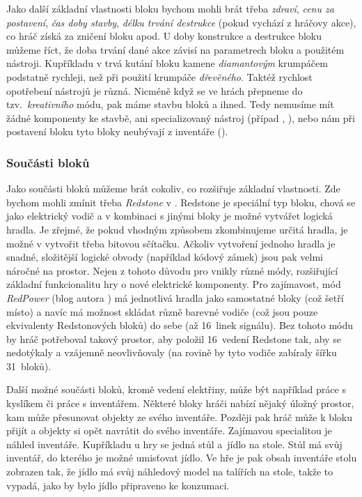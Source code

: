 Jako další základní vlastnosti bloku bychom mohli brát třeba \textit{zdraví}, \textit{cenu za postavení}, \textit{čas doby stavby}, \textit{délku trvání destrukce} (pokud vychází z hráčovy akce), co hráč získá za zničení bloku apod. U doby konstrukce a destrukce bloku můžeme říct, že doba trvání dané akce závisí na parametrech bloku a použitém nástroji. Kupříkladu v  trvá kutání bloku kamene \textit{diamantovým} krumpáčem podstatně rychleji, než při použití krumpáče \textit{dřevěného}. Taktéž rychlost opotřebení nástrojů je různá. Nicméně když se ve hrách přepneme do tzv.~\textit{kreativního} módu, pak máme stavbu bloků  a ihned. Tedy nemusíme mít žádné komponenty ke stavbě, ani specializovaný nástroj (případ \SE{}, \ME{}), nebo nám při postavení bloku tyto bloky neubývají z inventáře (\MC{}). 

\subsubsection{Součásti bloků}
Jako součásti bloků můžeme brát cokoliv, co rozšiřuje základní vlastnosti. Zde bychom mohli zmínit třeba \textit{Redstone} v . Redstone je speciální typ bloku, chová se jako elektrický vodič a v kombinaci s jinými bloky je možné vytvářet logická hradla. Je zřejmé, že pokud vhodným způsobem zkombinujeme určitá hradla, je možné v  vytvořit třeba bitovou sčítačku. Ačkoliv vytvoření jednoho hradla je snadné, složitější logické obvody (například kódový zámek) jsou pak velmi náročné na prostor. Nejen z tohoto důvodu pro \MC{} vnikly různé módy, rozšiřující základní funkcionalitu hry o nové elektrické komponenty. Pro zajímavost, mód \textit{RedPower} (blog autora \citep{eloraam}) má jednotlivá hradla jako samostatné bloky (což šetří místo) a navíc má možnost skládat různě barevné vodiče (což jsou pouze ekvivalenty Redstonových bloků) do sebe (až 16~linek signálu). Bez tohoto módu by hráč potřeboval takový prostor, aby položil 16~vedení Redstone tak, aby se nedotýkaly a vzájemně neovlivňovaly (na rovině by tyto vodiče zabíraly šířku 31~bloků). 

Další možné součásti bloků, kromě vedení elektřiny, může být například práce s kyslíkem či práce s inventářem. Některé bloky hráči nabízí nějaký úložný prostor, kam může přesunovat objekty ze svého inventáře. Později pak hráč může k bloku přijít a objekty si opět navrátit do svého inventáře. Zajímavou specialitou je náhled inventáře. Kupříkladu u hry \ME{} se jedná stůl a~jídlo na stole. Stůl má svůj inventář, do kterého je možné umisťovat jídlo. Ve hře je pak obsah inventáře stolu zobrazen tak, že jídlo má svůj náhledový model na talířích na stole, takže to vypadá, jako by bylo jídlo připraveno ke konzumaci. 



